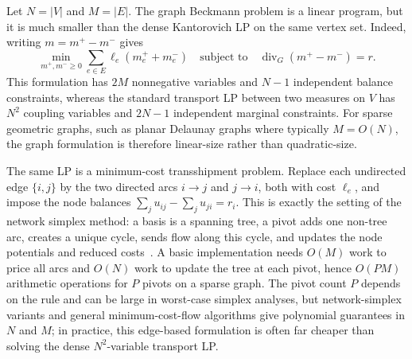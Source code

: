 \begin{rem}\label{rem-graph-w1-network-simplex}
	Let $N=|V|$ and $M=|E|$. The graph Beckmann problem is a linear program, but it is much smaller than the dense Kantorovich LP on the same vertex set. Indeed, writing $m=m^+-m^-$ gives
	\[
		\min_{m^+,m^-\geq0}\sum_{e\in E}\ell_e(m^+_e+m^-_e)
		\quad\text{subject to}\quad
		\operatorname{div}_G(m^+-m^-)=r .
	\]
	This formulation has $2M$ nonnegative variables and $N-1$ independent balance constraints, whereas the standard transport LP between two measures on $V$ has $N^2$ coupling variables and $2N-1$ independent marginal constraints. For sparse geometric graphs, such as planar Delaunay graphs where typically $M=O(N)$, the graph formulation is therefore linear-size rather than quadratic-size.

	The same LP is a minimum-cost transshipment problem. Replace each undirected edge $\{i,j\}$ by the two directed arcs $i\to j$ and $j\to i$, both with cost $\ell_e$, and impose the node balances $\sum_{j}u_{ij}-\sum_j u_{ji}=r_i$. This is exactly the setting of the network simplex method: a basis is a spanning tree, a pivot adds one non-tree arc, creates a unique cycle, sends flow along this cycle, and updates the node potentials and reduced costs~\cite{bertsekas1988dual,Orlin1997}. A basic implementation needs $O(M)$ work to price all arcs and $O(N)$ work to update the tree at each pivot, hence $O(PM)$ arithmetic operations for $P$ pivots on a sparse graph. The pivot count $P$ depends on the rule and can be large in worst-case simplex analyses, but network-simplex variants and general minimum-cost-flow algorithms give polynomial guarantees in $N$ and $M$; in practice, this edge-based formulation is often far cheaper than solving the dense $N^2$-variable transport LP.
\end{rem}

